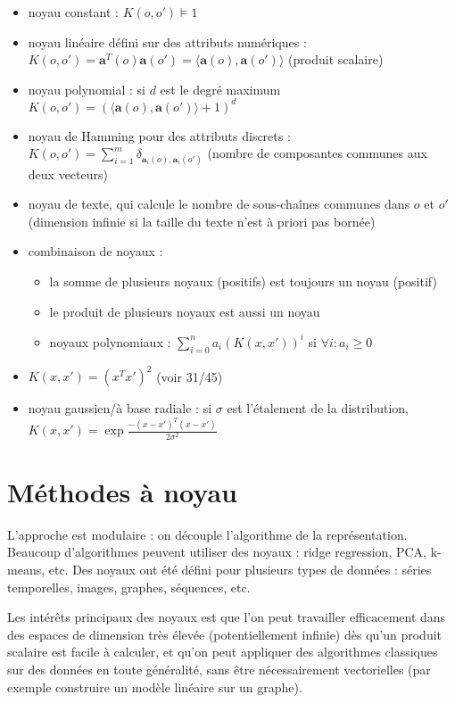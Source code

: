 \begin{itemize}
	\item noyau constant : $K(o, o') \models 1$
	\item noyau linéaire défini sur des attributs numériques : $K(o, o') = \mathbf{a}^T(o) \mathbf{a}(o') = \langle \mathbf{a}(o), \mathbf{a}(o')\rangle$ (produit scalaire)
	\item noyau polynomial : si $d$ est le degré maximum $K(o, o') = (\langle \mathbf{a}(o), \mathbf{a}(o') \rangle + 1)^d$
	\item noyau de Hamming pour des attributs discrets : $K(o, o') = \sum_{i = 1}^m \delta_{\mathbf{a}_i(o), \mathbf{a}_i(o')}$ (nombre de composantes communes aux deux vecteurs)
	\item noyau de texte, qui calcule le nombre de sous-chaînes communes dans $o$ et $o'$ (dimension infinie si la taille du texte n'est à priori pas bornée)
	\item combinaison de noyaux :
	
	\begin{itemize}
		\item la somme de plusieurs noyaux (positifs) est toujours un noyau (positif)
		\item le produit de plusieurs noyaux est aussi un noyau
		\item noyaux polynomiaux : $\sum_{i = 0}^n a_i(K(x, x'))^i$ si $\forall i : a_i \geq 0$
	\end{itemize}
	
	\item $K(x, x') = (x^Tx')^2$ (voir 31/45)
	\item noyau gaussien/à base radiale : si $\sigma$ est l'étalement de la distribution, $K(x, x') = \exp{\frac{-(x - x')^T(x - x')}{2 \sigma^2}}$
\end{itemize}


\section{Méthodes à noyau}


L'approche est modulaire : on découple l'algorithme de la représentation. Beaucoup d'algorithmes peuvent utiliser des noyaux : ridge regression, PCA, k-means, etc. Des noyaux ont été défini pour plusieurs types de données : séries temporelles, images, graphes, séquences, etc.

Les intérêts principaux des noyaux est que l'on peut travailler efficacement dans des espaces de dimension très élevée (potentiellement infinie) dès qu'un produit scalaire est facile à calculer, et qu'on peut appliquer des algorithmes classiques sur des données en toute généralité, sans être nécessairement vectorielles (par exemple construire un modèle linéaire sur un graphe).

